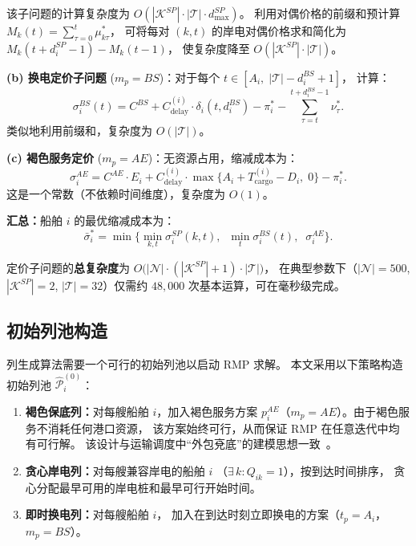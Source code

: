 \documentclass[UTF8, a4paper, 12pt]{ctexart}
\begin{document}
\noindent
该子问题的计算复杂度为 $O(|\mathcal{K}^{SP}| \cdot |\mathcal{T}| \cdot d_{\max}^{SP})$。
利用对偶价格的前缀和预计算
$M_{k}(t) = \sum_{\tau=0}^{t} \mu_{k\tau}^*$，
可将每对 $(k, t)$ 的岸电对偶价格求和简化为
$M_{k}(t + d_i^{SP} - 1) - M_{k}(t - 1)$，
使复杂度降至 $O(|\mathcal{K}^{SP}| \cdot |\mathcal{T}|)$。

\medskip
\noindent\textbf{(b) 换电定价子问题}
($m_p = BS$)：对于每个 $t \in [A_i,\; |\mathcal{T}| - d_i^{BS} + 1]$，
计算：
\begin{equation}
  \sigma_i^{BS}(t)
  = C^{BS} + C_{\text{delay}}^{(i)} \cdot \delta_i(t, d_i^{BS})
  - \pi_i^*
  - \sum_{\tau = t}^{t + d_i^{BS} - 1} \nu_{\tau}^*.
  \label{eq:price_bs}
\end{equation}
类似地利用前缀和，复杂度为 $O(|\mathcal{T}|)$。

\medskip
\noindent\textbf{(c) 褐色服务定价}
($m_p = AE$)：无资源占用，缩减成本为：
\begin{equation}
  \sigma_i^{AE}
  = C^{AE} \cdot E_i
  + C_{\text{delay}}^{(i)} \cdot \max\!\big\{A_i + T_{\text{cargo}}^{(i)} - D_i,\; 0\big\}
  - \pi_i^*.
  \label{eq:price_ae}
\end{equation}
这是一个常数（不依赖时间维度），复杂度为 $O(1)$。

\medskip
\noindent\textbf{汇总：}船舶 $i$ 的最优缩减成本为：
\begin{equation}
  \bar{\sigma}_i^* = \min\!\Big\{
    \min_{k,t} \sigma_i^{SP}(k,t),\;\;
    \min_{t} \sigma_i^{BS}(t),\;\;
    \sigma_i^{AE}
  \Big\}.
  \label{eq:price_min}
\end{equation}

\noindent
定价子问题的\textbf{总复杂度}为
$O\!\big(|\mathcal{N}| \cdot (|\mathcal{K}^{SP}| + 1) \cdot |\mathcal{T}|\big)$，
在典型参数下（$|\mathcal{N}| = 500$, $|\mathcal{K}^{SP}| = 2$,
$|\mathcal{T}| = 32$）仅需约 $48{,}000$ 次基本运算，可在毫秒级完成。

\subsection{初始列池构造}
\label{sec:cg_init}

列生成算法需要一个可行的初始列池以启动 RMP 求解。
本文采用以下策略构造初始列池 $\hat{\mathcal{P}}_i^{(0)}$：
\begin{enumerate}
  \item \textbf{褐色保底列：}对每艘船舶 $i$，加入褐色服务方案
        $p_i^{AE}$（$m_p = AE$）。由于褐色服务不消耗任何港口资源，
        该方案始终可行，从而保证 RMP 在任意迭代中均有可行解。
        该设计与运输调度中“外包兗底”的建模思想一致~\cite{Cordeau2015}。
  \item \textbf{贪心岸电列：}对每艘兼容岸电的船舶 $i$
        （$\exists\, k: Q_{ik} = 1$），按到达时间排序，
        贪心分配最早可用的岸电桩和最早可行开始时间。
  \item \textbf{即时换电列：}对每艘船舶 $i$，
        加入在到达时刻立即换电的方案（$t_p = A_i$，$m_p = BS$）。
\end{enumerate}
\end{document}
